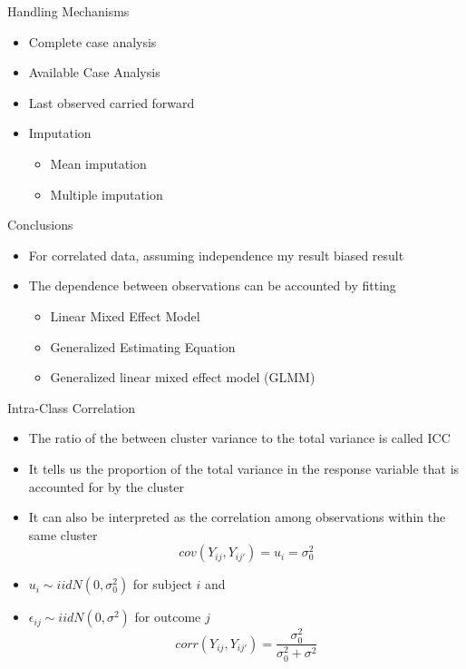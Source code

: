 \documentclass{beamer}
\begin{document}
\begin{frame}{Handling Mechanisms}
\begin{itemize}
	\item Complete case analysis \vspace{0.5cm}
	\item Available Case Analysis \vspace{0.5cm}
	\item Last observed carried forward \vspace{0.5cm}
	\item Imputation \vspace{0.5cm}
	\begin{itemize}
		\item Mean imputation \vspace{0.5cm}
		\item Multiple imputation 
	\end{itemize}
\end{itemize}
\end{frame}

\begin{frame}{Conclusions}
\begin{itemize}
\item For correlated data, assuming independence my result biased result \vspace{0.25cm}
\item The dependence between observations can be accounted by fitting \vspace{0.25cm}
\begin{itemize}
\item Linear Mixed Effect Model \vspace{0.25cm}
\item Generalized Estimating Equation \vspace{0.25cm}
\item Generalized linear mixed effect model (GLMM)
\end{itemize}
\end{itemize}
\end{frame}

\begin{frame}{Intra-Class Correlation}
\begin{itemize}
	\item The ratio of the between cluster variance to the total variance is called ICC 
	\item It tells us the proportion of the total variance in the response variable that is accounted for by the cluster 
	\item It can also be interpreted as the correlation among observations within the same cluster 
	\[cov(Y_{ij},Y_{ij'})=u_i=\sigma_{0}^2\]
	\item $u_i\sim iidN(0,\sigma_{0}^2)$ for subject $i$ and 
	\item $\epsilon_{ij}\sim iidN(0,\sigma^2)$ for outcome $j$
	\[corr(Y_{ij},Y_{ij'})=\frac{\sigma_{0}^2}{\sigma_{0}^2+\sigma^2}\]
\end{itemize}
\end{frame}
\end{document}
